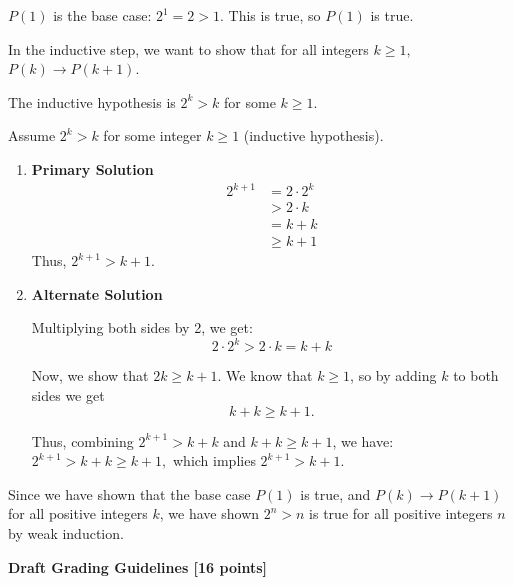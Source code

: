 \documentclass[12pt]{exam}
\begin{document}
\begin{solution}
\begin{parts}
    \item $P(1)$ is the base case: \(2^1 = 2 > 1\). This is true, so $P(1)$ is true.
    \item In the inductive step, we want to show that for all integers $k \geq 1,$ $P(k) \rightarrow P(k+1)$. 
    \item The inductive hypothesis is \(2^k > k\) for some $k\ge 1.$
    \item Assume \(2^k > k\) for some integer $k \geq 1$ (inductive hypothesis). 
    \begin{enumerate}
        \item \textbf{Primary Solution}
        \begin{align*}
            2^{k+1} &= 2\cdot 2^k \\
            &> 2\cdot k \tag{by IH} \\
            &= k + k \\
            &\ge k + 1 \tag{since $k\ge 1$}
        \end{align*}
        Thus, $2^{k+1} > k+1.$
        \item \textbf{Alternate Solution}
        
        Multiplying both sides by 2, we get:
        \[2 \cdot 2^k > 2 \cdot k = k + k\]
        
        Now, we show that \(2k \geq k+1\). We know that \(k \geq 1\), so by adding $k$ to both sides we get
        $$k + k \ge k + 1.$$
        
        Thus, combining \(2^{k+1} > k + k\) and \(k + k \geq k+1\), we have:
        \(2^{k+1} > k + k \geq k+1,\) which implies \(2^{k+1} > k+1\).
    \end{enumerate}
    \item Since we have shown that the base case $P(1)$ is true, and $P(k) \rightarrow P(k+1)$ for all positive integers $k$, we have shown \(2^n > n\) is true for all positive integers $n$ by weak induction.
\end{parts}
\smallskip

\textbf{Draft Grading Guidelines [16 points]}


\end{solution}
\end{document}
